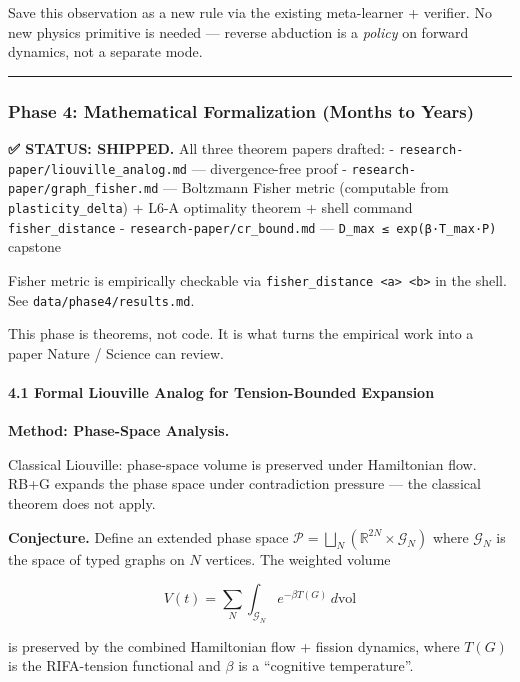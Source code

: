 \documentclass[
  11pt,
  a4paper,
]{article}
\begin{document}
Save this observation as a new rule via the existing meta-learner +
verifier. No new physics primitive is needed --- reverse abduction is a
\emph{policy} on forward dynamics, not a separate mode.

\begin{center}\rule{0.5\linewidth}{0.5pt}\end{center}

\subsubsection{Phase 4: Mathematical Formalization (Months to
Years)}\label{phase-4-mathematical-formalization-months-to-years}

\textbf{✅ STATUS: SHIPPED.} All three theorem papers drafted: -
\texttt{research-paper/liouville\_analog.md} --- divergence-free proof -
\texttt{research-paper/graph\_fisher.md} --- Boltzmann Fisher metric
(computable from \texttt{plasticity\_delta}) + L6-A optimality theorem +
shell command \texttt{fisher\_distance} -
\texttt{research-paper/cr\_bound.md} ---
\texttt{D\_max\ ≤\ exp(β·T\_max·P)} capstone

Fisher metric is empirically checkable via
\texttt{fisher\_distance\ \textless{}a\textgreater{}\ \textless{}b\textgreater{}}
in the shell. See \texttt{data/phase4/results.md}.

This phase is theorems, not code. It is what turns the empirical work
into a paper Nature / Science can review.

\paragraph{4.1 Formal Liouville Analog for Tension-Bounded
Expansion}\label{formal-liouville-analog-for-tension-bounded-expansion}

\textbf{Method: Phase-Space Analysis.}

Classical Liouville: phase-space volume is preserved under Hamiltonian
flow. RB+G expands the phase space under contradiction pressure --- the
classical theorem does not apply.

\textbf{Conjecture.} Define an extended phase space
\(\mathcal{P} = \bigsqcup_N (\mathbb{R}^{2N} \times \mathcal{G}_N)\)
where \(\mathcal{G}_N\) is the space of typed graphs on \(N\) vertices.
The weighted volume

\[
V(t) = \sum_N \int_{\mathcal{G}_N} e^{-\beta T(G)} \, d\text{vol}
\]

is preserved by the combined Hamiltonian flow + fission dynamics, where
\(T(G)\) is the RIFA-tension functional and \(\beta\) is a ``cognitive
temperature''.
\end{document}
